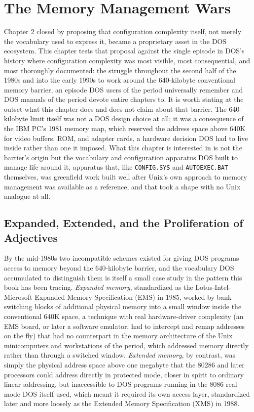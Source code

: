 \documentclass[11pt]{book}
\begin{document}
\chapter{The Memory Management Wars}

Chapter 2 closed by proposing that configuration complexity itself, not merely the vocabulary used to express it, became a proprietary asset in the DOS ecosystem. This chapter tests that proposal against the single episode in DOS's history where configuration complexity was most visible, most consequential, and most thoroughly documented: the struggle throughout the second half of the 1980s and into the early 1990s to work around the 640-kilobyte conventional memory barrier, an episode DOS users of the period universally remember and DOS manuals of the period devote entire chapters to. It is worth stating at the outset what this chapter does and does not claim about that barrier. The 640-kilobyte limit itself was not a DOS design choice at all; it was a consequence of the IBM PC's 1981 memory map, which reserved the address space above 640K for video buffers, ROM, and adapter cards, a hardware decision DOS had to live inside rather than one it imposed. What this chapter is interested in is not the barrier's origin but the vocabulary and configuration apparatus DOS built to manage life around it, apparatus that, like \texttt{CONFIG.SYS} and \texttt{AUTOEXEC.BAT} themselves, was greenfield work built well after Unix's own approach to memory management was available as a reference, and that took a shape with no Unix analogue at all.

\section{Expanded, Extended, and the Proliferation of Adjectives}

By the mid-1980s two incompatible schemes existed for giving DOS programs access to memory beyond the 640-kilobyte barrier, and the vocabulary DOS accumulated to distinguish them is itself a small case study in the pattern this book has been tracing. \emph{Expanded memory}, standardized as the Lotus-Intel-Microsoft Expanded Memory Specification (EMS) in 1985, worked by bank-switching blocks of additional physical memory into a small window inside the conventional 640K space, a technique with real hardware-driver complexity (an EMS board, or later a software emulator, had to intercept and remap addresses on the fly) that had no counterpart in the memory architecture of the Unix minicomputers and workstations of the period, which addressed memory directly rather than through a switched window. \emph{Extended memory}, by contrast, was simply the physical address space above one megabyte that the 80286 and later processors could address directly in protected mode, closer in spirit to ordinary linear addressing, but inaccessible to DOS programs running in the 8086 real mode DOS itself used, which meant it required its own access layer, standardized later and more loosely as the Extended Memory Specification (XMS) in 1988.
\end{document}
